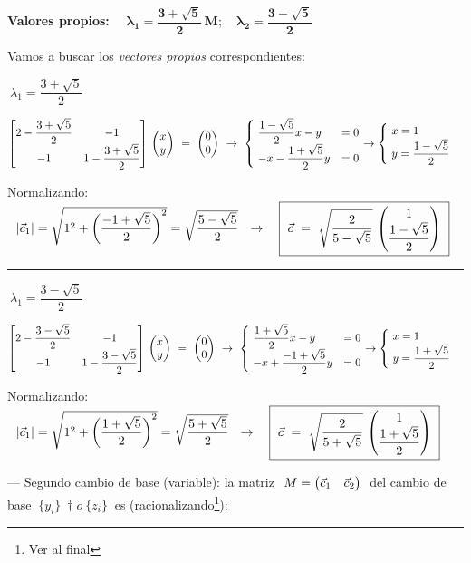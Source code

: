 \textbf{Valores propios:} $\quad \boldsymbol{\lambda_1=\dfrac {3 + \sqrt{5}}{2}\, M; \quad \lambda_2=\dfrac {3 - \sqrt{5}}{2}}$

Vamos a buscar los \emph{vectores propios} correspondientes:

$\boxed{\ \lambda_1=\dfrac {3 + \sqrt{5}}{2}  \  }\quad$ 

$\mqty[2-\dfrac {3 + \sqrt{5}}{2}&-1\\-1&1-\dfrac {3 + \sqrt{5}}{2}]\ \mqty(x\\y) \ = \ \mqty(0\\0)  \ \to \
\begin{cases} 
\ \dfrac{1-\sqrt{5}}{2}	x-y &=0 \\ \ -x-\dfrac{1+\sqrt{5}}{2}y&=0
\end{cases} 
\to \begin{cases} \ x=1 \\ \  y=\dfrac{1-\sqrt{5}}{2} \end{cases}$

Normalizando: $\ \ |\vec c_1|=\sqrt{1^2+\left( \dfrac{-1+\sqrt{5}}{2} \right)^2 } =\sqrt{\dfrac{5-\sqrt{5}}{2}} \ \ \to \quad 
\boxed{\ \vec c \ = \ \sqrt{\dfrac{2}{5-\sqrt{5}}} \ \mqty(1 \\ \dfrac{1-\sqrt{5}}{2}) \ }$

\rule{200pt}{0.1pt}

$\boxed{\ \lambda_1=\dfrac {3 - \sqrt{5}}{2}  \  }\quad$ 

$\mqty[2-\dfrac {3 - \sqrt{5}}{2}&-1\\-1&1-\dfrac {3 - \sqrt{5}}{2}]\ \mqty(x\\y) \ = \ \mqty(0\\0)  \ \to \
\begin{cases} 
\ \dfrac{1+\sqrt{5}}{2}	x-y &=0 \\ \ -x+\dfrac{-1+\sqrt{5}}{2}y&=0
\end{cases} 
\to \begin{cases} \ x=1 \\ \  y=\dfrac{1+\sqrt{5}}{2} \end{cases}$

Normalizando: $\ \ |\vec c_1|=\sqrt{1^2+\left( \dfrac{1+\sqrt{5}}{2} \right)^2 } =\sqrt{\dfrac{5+\sqrt{5}}{2}} \ \ \to \quad 
\boxed{\ \vec c \ = \ \sqrt{\dfrac{2}{5+\sqrt{5}}} \ \mqty(1 \\ \dfrac{1+\sqrt{5}}{2}) \ }$

\vspace{5mm}

--- Segundo cambio de base (variable):  la matriz $ \ M=\mqty(\vec c_1 & \vec c_2) \ $ del cambio de base $\ \{ y_i \}\ †o \ \{ z_i\} \ $ es (racionalizando\footnote{ Ver al final}):


